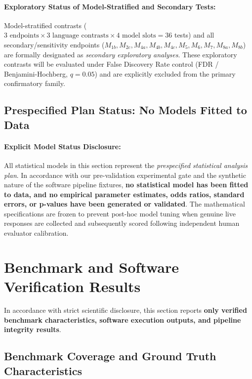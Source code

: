 \documentclass[11pt,a4paper]{article}
\begin{document}
\paragraph{Exploratory Status of Model-Stratified and Secondary Tests:} Model-stratified contrasts ($3 \text{ endpoints} \times 3 \text{ language contrasts} \times 4 \text{ model slots} = 36$ tests) and all secondary/sensitivity endpoints ($M_{1b}, M_{2c}, M_{4a}, M_{4b}, M_{4c}, M_5, M_6, M_7, M_{8a}, M_{8b}$) are formally designated as \emph{secondary exploratory analyses}. These exploratory contrasts will be evaluated under False Discovery Rate control (FDR / Benjamini-Hochberg, $q = 0.05$) and are explicitly excluded from the primary confirmatory family.

\subsection{Prespecified Plan Status: No Models Fitted to Data}
\label{sec:no_models_fitted}

\paragraph{Explicit Model Status Disclosure:} All statistical models in this section represent the \emph{prespecified statistical analysis plan}. In accordance with our pre-validation experimental gate and the synthetic nature of the software pipeline fixtures, \textbf{no statistical model has been fitted to data, and no empirical parameter estimates, odds ratios, standard errors, or p-values have been generated or validated}. The mathematical specifications are frozen to prevent post-hoc model tuning when genuine live responses are collected and subsequently scored following independent human evaluator calibration.

\section{Benchmark and Software Verification Results}
\label{sec:results}

In accordance with strict scientific disclosure, this section reports \textbf{only verified benchmark characteristics, software execution outputs, and pipeline integrity results}.

\subsection{Benchmark Coverage and Ground Truth Characteristics}
\label{sec:benchmark_characteristics}
\end{document}
